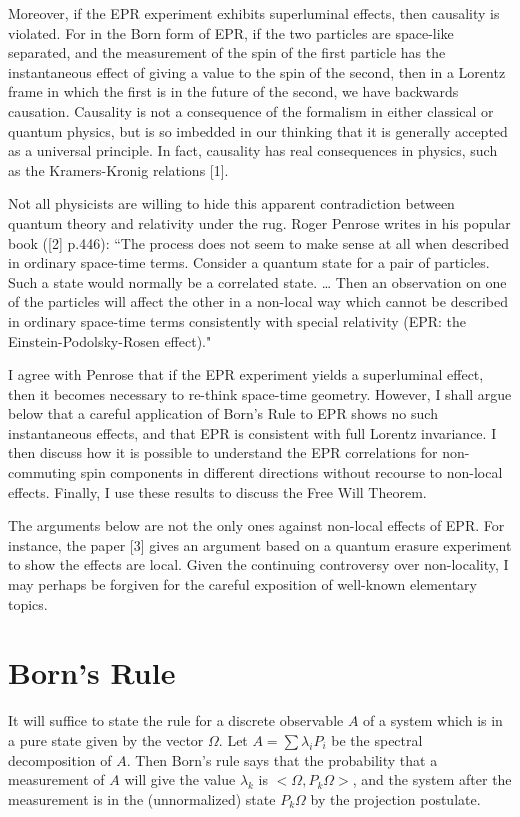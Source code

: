 \documentclass{article}
\begin{document}
Moreover, if the EPR experiment exhibits superluminal effects, then causality is violated. For in the Born form of EPR, if the two particles are space-like separated, and the measurement of the spin of the first particle has the instantaneous effect of giving a value to the spin of the second, then in a Lorentz frame in which the first is in the future of the second, we have backwards causation. Causality is not a consequence of the formalism in either classical or quantum physics, but is so imbedded in our thinking that it is generally accepted as a universal principle. In fact, causality has real consequences in physics, such as the Kramers-Kronig relations [1].

Not all physicists are willing to hide this apparent contradiction between quantum theory and relativity under the rug. Roger Penrose writes in his popular book ([2] p.446):
``The process does not seem to make sense at all when described in ordinary space-time terms. Consider a quantum state for a pair of particles. Such a state would normally be a correlated state. … Then an observation on one of the particles will affect the other in a non-local way which cannot be described in ordinary space-time terms consistently with special relativity (EPR: the Einstein-Podolsky-Rosen effect)."

I agree with Penrose that if the EPR experiment yields a superluminal effect, then it becomes necessary to re-think space-time geometry. However, I shall argue below that a careful application of  Born's Rule to EPR shows no such instantaneous effects, and that EPR is consistent with full Lorentz invariance. I then discuss how it is possible to understand the EPR correlations for non-commuting spin components in different directions without recourse to non-local effects. Finally, I use these results to discuss the Free Will Theorem. 

The arguments below are not the only ones against non-local effects of EPR. For instance, the paper [3] gives an argument based on a quantum erasure experiment to show the effects are local. Given the continuing controversy over non-locality, I may perhaps be forgiven for the careful exposition of well-known elementary topics.  

\section*{Born's Rule}
It will suffice to state the rule for a discrete observable $A$ of a system which is in a pure state given by the vector $\Omega$. Let $A = \sum \lambda_i P_i$  be the spectral decomposition of $A$. Then Born's rule says that the probability that a measurement of $A$ will give the value $\lambda_k$  is $<\Omega, P_k \Omega>$, and the system after the measurement is in the (unnormalized) state $P_k\Omega$ by the projection postulate.
\end{document}
